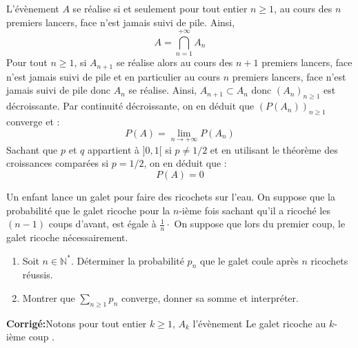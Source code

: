 \documentclass[a4paper,twoside,french,10pt]{VcCours}
\newcommand{\corr}{\textbf{Corrigé:}}
\begin{document}
\begin{enumerate}
\noindent L'évènement $A$ se réalise si et seulement pour tout entier $n \geq 1$, au cours des $n$ premiers lancers, face n'est jamais suivi de pile. Ainsi,
$$ A = \bigcap_{n=1}^{+ \infty} A_n$$
Pour tout $n \geq 1$, si $A_{n+1}$ se réalise alors au cours des $n+1$ premiers lancers, face n'est jamais suivi de pile et en particulier au cours $n$ premiers lancers, face n'est jamais suivi de pile donc $A_n$ se réalise. Ainsi, $A_{n+1} \subset A_n$ donc $(A_n)_{n \geq 1}$ est décroissante. Par continuité décroissante, on en déduit que $(P(A_n))_{n \geq 1}$ converge et :
$$ P(A) = \lim_{n \rightarrow + \infty} P(A_n)$$
Sachant que $p$ et $q$ appartient à $]0,1[$ si $p \neq 1/2$ et en utilisant le théorème des croissances comparées si $p=1/2$, on en déduit que :
$$ P(A)=0$$
\end{enumerate}

\begin{Exercice}{} Un enfant lance un galet pour faire des ricochets sur l'eau. On suppose que la probabilité que le galet ricoche pour la $n$-ième fois sachant qu'il a ricoché les $(n-1)$ coups d'avant, est égale à $\frac{1}{n}\cdot$ On suppose que lors du premier coup, le galet ricoche nécessairement.
\begin{enumerate}
\item Soit $n \in \mathbb{N}^*$. Déterminer la probabilité $p_n$ que le galet coule après $n$ ricochets réussis.
\item Montrer que $\sum_{n \geq 1} p_n$ converge, donner sa somme et interpréter.
\end{enumerate}
\end{Exercice}

\corr Notons pour tout entier $k \geq 1$, $A_k$ l'évènement \og Le galet ricoche au $k$-ième coup \fg.
\end{document}
